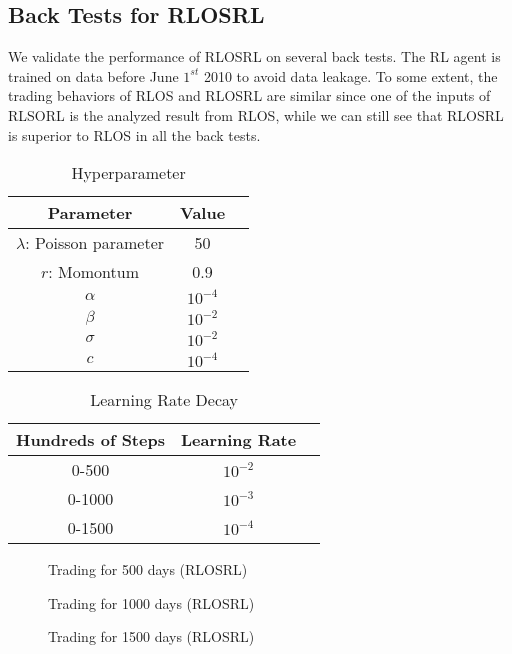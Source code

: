 \documentclass{gapd}
\begin{document}
\subsection{Back Tests for RLOSRL}
We validate the performance of RLOSRL on several back tests. The RL agent is trained on data before June $1^{st}$ 2010 to avoid data leakage. To some extent, the trading behaviors of RLOS and RLOSRL are similar since one of the inputs of RLSORL is the analyzed result from RLOS, while we can still see that RLOSRL is superior to RLOS in all the back tests.
\begin{table}
\begin{tabular}{ccc}
\hline
Parameter &Value \\
\hline
$\lambda$: Poisson parameter& 50\\
$r$: Momontum& 0.9\\
$\alpha$& $10^{-4}$\\
$\beta$& $10^{-2}$\\
$\sigma$& $10^{-2}$\\
$c$& $10^{-4}$
\end{tabular}
\caption{Hyperparameter}
\end{table}
\begin{table}
\begin{tabular}{ccc}
\hline
Hundreds of Steps &Learning Rate \\
\hline
0-500& $10^{-2}$\\
0-1000& $10^{-3}$\\
0-1500& $10^{-4}$
\end{tabular}
\caption{Learning Rate Decay}
\end{table}
\begin{figure}[H]
\centering
{}
\caption{Trading for 500 days (RLOSRL) }
\label{Fig.lable}
\end{figure}
\begin{figure}[H]
\centering
{}
\caption{Trading for 1000 days (RLOSRL) }
\label{Fig.lable}
\end{figure}
\begin{figure}[H]
\centering
{}
\caption{Trading for 1500 days (RLOSRL) }
\label{Fig.lable}
\end{figure}
\end{document}
